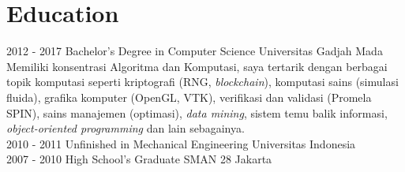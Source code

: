 \documentclass[]{friggeri-cv}
\begin{document}
\section{Education}
\begin{entrylist}
  \entry
    {2012 - 2017}
    {Bachelor's Degree in Computer Science}
    {Universitas Gadjah Mada}
    {Memiliki konsentrasi Algoritma dan Komputasi, saya tertarik dengan berbagai topik komputasi seperti kriptografi (RNG, \textit{blockchain}), komputasi sains (simulasi fluida), grafika komputer (OpenGL, VTK), verifikasi dan validasi (Promela SPIN), sains manajemen (optimasi), \textit{data mining}, sistem temu balik informasi, \textit{object-oriented programming} dan lain sebagainya.\\}
  \entry  
    {2010 - 2011}
    {Unfinished in Mechanical Engineering}
    {Universitas Indonesia}
    {\\}
  \entry
    {2007 - 2010}
    {High School's Graduate}
    {SMAN 28 Jakarta}
    {\\}
\end{entrylist}

\newpage
\end{document}
